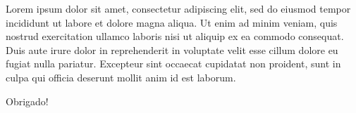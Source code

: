 \documentclass[aspectratio=169]{beamer}
\begin{document}
\begin{frame}[standout]
  \begin{standoutbox}[comp300]
    Lorem ipsum dolor sit amet, consectetur adipiscing elit, sed do eiusmod tempor incididunt ut labore et dolore magna aliqua. Ut enim ad minim veniam, quis nostrud exercitation ullamco laboris nisi ut aliquip ex ea commodo consequat. Duis aute irure dolor in reprehenderit in voluptate velit esse cillum dolore eu fugiat nulla pariatur. Excepteur sint occaecat cupidatat non proident, sunt in culpa qui officia deserunt mollit anim id est laborum.
  \end{standoutbox}
\end{frame}

\begin{frame}[standout]
  \begin{standoutbox}
    Obrigado!
  \end{standoutbox}
\end{frame}
\end{document}
